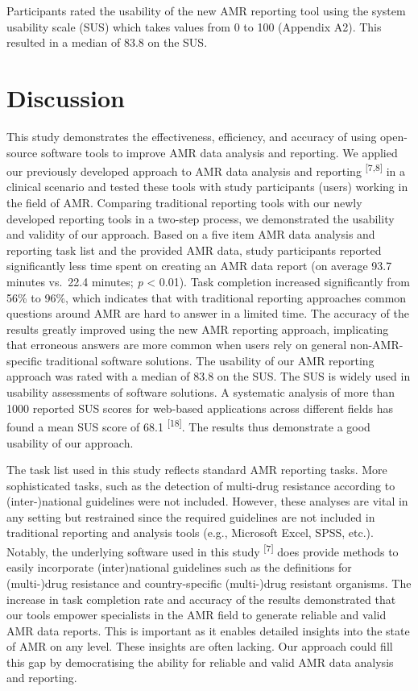 \documentclass[
]{book}
\begin{document}
Participants rated the usability of the new AMR reporting tool using the system usability scale (SUS) which takes values from 0 to 100 (Appendix A2). This resulted in a median of 83.8 on the SUS.

\hypertarget{discussion-2}{%
\section{Discussion}\label{discussion-2}}

This study demonstrates the effectiveness, efficiency, and accuracy of using open-source software tools to improve AMR data analysis and reporting. We applied our previously developed approach to AMR data analysis and reporting \textsuperscript{{[}7,8{]}} in a clinical scenario and tested these tools with study participants (users) working in the field of AMR. Comparing traditional reporting tools with our newly developed reporting tools in a two-step process, we demonstrated the usability and validity of our approach. Based on a five item AMR data analysis and reporting task list and the provided AMR data, study participants reported significantly less time spent on creating an AMR data report (on average 93.7 minutes vs.~22.4 minutes; \emph{p} \textless{} 0.01). Task completion increased significantly from 56\% to 96\%, which indicates that with traditional reporting approaches common questions around AMR are hard to answer in a limited time. The accuracy of the results greatly improved using the new AMR reporting approach, implicating that erroneous answers are more common when users rely on general non-AMR-specific traditional software solutions. The usability of our AMR reporting approach was rated with a median of 83.8 on the SUS. The SUS is widely used in usability assessments of software solutions. A systematic analysis of more than 1000 reported SUS scores for web-based applications across different fields has found a mean SUS score of 68.1 \textsuperscript{{[}18{]}}. The results thus demonstrate a good usability of our approach.

The task list used in this study reflects standard AMR reporting tasks. More sophisticated tasks, such as the detection of multi-drug resistance according to (inter-)national guidelines were not included. However, these analyses are vital in any setting but restrained since the required guidelines are not included in traditional reporting and analysis tools (e.g., Microsoft Excel, SPSS, etc.). Notably, the underlying software used in this study \textsuperscript{{[}7{]}} does provide methods to easily incorporate (inter)national guidelines such as the definitions for (multi-)drug resistance and country-specific (multi-)drug resistant organisms. The increase in task completion rate and accuracy of the results demonstrated that our tools empower specialists in the AMR field to generate reliable and valid AMR data reports. This is important as it enables detailed insights into the state of AMR on any level. These insights are often lacking. Our approach could fill this gap by democratising the ability for reliable and valid AMR data analysis and reporting.
\end{document}
